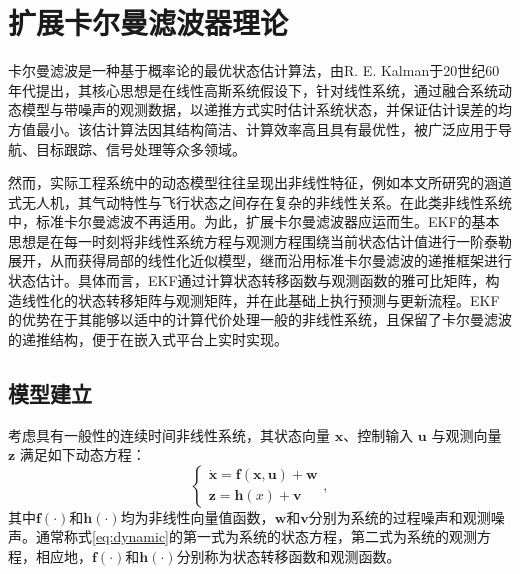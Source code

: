 \section{扩展卡尔曼滤波器理论}%
卡尔曼滤波是一种基于概率论的最优状态估计算法，由R. E. Kalman于20世纪60年代提出，其核心思想是在线性高斯系统假设下，针对线性系统，通过融合系统动态模型与带噪声的观测数据，以递推方式实时估计系统状态，并保证估计误差的均方值最小。该估计算法因其结构简洁、计算效率高且具有最优性，被广泛应用于导航、目标跟踪、信号处理等众多领域。

然而，实际工程系统中的动态模型往往呈现出非线性特征，例如本文所研究的涵道式无人机，其气动特性与飞行状态之间存在复杂的非线性关系。在此类非线性系统中，标准卡尔曼滤波不再适用。为此，扩展卡尔曼滤波器应运而生。EKF的基本思想是在每一时刻将非线性系统方程与观测方程围绕当前状态估计值进行一阶泰勒展开，从而获得局部的线性化近似模型，继而沿用标准卡尔曼滤波的递推框架进行状态估计。具体而言，EKF通过计算状态转移函数与观测函数的雅可比矩阵，构造线性化的状态转移矩阵与观测矩阵，并在此基础上执行预测与更新流程。EKF的优势在于其能够以适中的计算代价处理一般的非线性系统，且保留了卡尔曼滤波的递推结构，便于在嵌入式平台上实时实现。
\subsection{模型建立}
考虑具有一般性的连续时间非线性系统，其状态向量 $\boldsymbol{x}$、控制输入 $\boldsymbol{u}$ 与观测向量 $\boldsymbol{z}$ 满足如下动态方程：
\begin{equation}
    \begin{cases}
        \dot{\boldsymbol{x}} = \boldsymbol{f}(\boldsymbol{x}, \boldsymbol{u}) + \boldsymbol{w}\\
        \boldsymbol{z} = \boldsymbol{h}(x) + \boldsymbol{v}
        \label{eq:dynamic}
    \end{cases},
\end{equation}
其中$\boldsymbol{f}(\cdot)$和$\boldsymbol{h}(\cdot)$均为非线性向量值函数，$\boldsymbol{w}$和$\boldsymbol{v}$分别为系统的过程噪声和观测噪声。通常称式\eqref{eq:dynamic}的第一式为系统的状态方程，第二式为系统的观测方程，相应地，$\boldsymbol{f}(\cdot)$和$\boldsymbol{h}(\cdot)$分别称为状态转移函数和观测函数。

